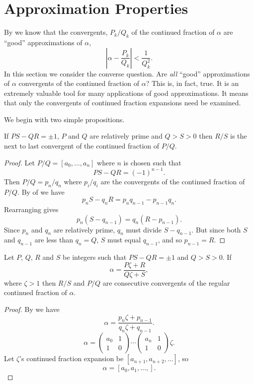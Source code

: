 \section{Approximation Properties}
\label{CF:Approximation:Sec}

By  we know that the convergents,
$P_k/Q_k$ of the continued fraction of $\alpha$ are ``good''
approximations of $\alpha$, \ie
\[
\left|\alpha - \frac{P_k}{Q_k} \right| < \frac{1}{Q_k^2}.
\]
In this section we consider the converse question.  Are {\em all}
``good'' approximations of $\alpha$ convergents of the continued
fraction of $\alpha$?  This is, in fact, true.  It is an extremely
valuable tool for many applications of good approximations.  It means
that only the convergents of continued fraction expansions need be
examined.  

We begin with two simple propositions.

\begin{proposition}\label{CF:Consecutive:Prop}
If $PS - QR = \pm 1$, $P$ and $Q$ are relatively prime and $Q > S > 0$
then  $R/S$ is the next to last convergent of the continued fraction
of $P/Q$.
\end{proposition}

\begin{proof}
Let $P/Q = [a_0, \ldots, a_n]$ where $n$ is chosen such that 
\[
PS - QR = (-1)^{n-1}.
\]
Then $P/Q = p_n/q_n$ where $p_i/q_i$ are the convergents of the
continued fraction of $P/Q$.  By  of
 we have
\[
p_n S - q_n R = p_n q_{n-1} - p_{n-1} q_n.
\]
Rearranging gives
\[
p_n (S- q_{n-1} ) = q_n (R - p_{n-1}).
\]
Since $p_n$ and $q_n$ are relatively prime, $q_n$ must divide $S -
q_{n-1}$.  But since both $S$ and $q_{n-1}$ are less than $q_n = Q$,
$S$ must equal $q_{n-1}$, and so $p_{n-1} = R$.
\end{proof}

\begin{proposition}\label{CF:Consecutive:2:Prop}
Let $P$, $Q$, $R$ and $S$ be integers such that $PS-QR = \pm 1$ and $Q
> S > 0$.  If
\[
\alpha = \frac{P \zeta + R}{Q \zeta + S},
\]
where $\zeta > 1$ then $R/S$ and $P/Q$ are consecutive convergents of
the regular continued fraction of $\alpha$.
\end{proposition}

\begin{proof}
By  we have
\[
\alpha = \frac{p_n \zeta + p_{n-1}}{q_n \zeta + q_{n-1}}.
\]
\ie
\[
\alpha = \begin{pmatrix}a_0 & 1 \\ 1& 0\end{pmatrix} \cdots 
  \begin{pmatrix}a_n & 1 \\ 1 & 0 \end{pmatrix} \zeta.
\]
Let $\zeta$'s continued fraction expansion be $[a_{n+1}, a_{n+2},
\ldots ]$, so 
\[
\alpha = [a_0, a_1, \ldots, ].
\]
\end{proof}

